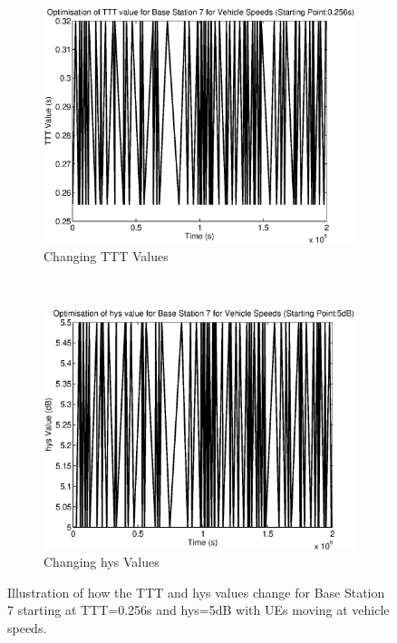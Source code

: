 \begin{figure}[H]
        \centering
        \begin{subfigure}[b]{0.49\textwidth}
                \includegraphics[width=\textwidth]{figures/graphs/vehmid/TTT7.eps}
                \caption{Changing TTT Values}
        \end{subfigure}%
        ~ %
        \begin{subfigure}[b]{0.49\textwidth}
                \includegraphics[width=\textwidth]{figures/graphs/vehmid/hys7.eps}
                \caption{Changing hys Values}
        \end{subfigure}
        \caption{Illustration of how the TTT and hys values change for Base Station 7 starting at TTT=0.256s and hys=5dB with UEs moving at vehicle speeds.}
\end{figure}
